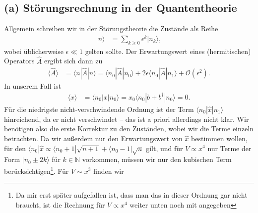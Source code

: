 \documentclass[english, parskip=full]{scrartcl}
\renewcommand{\bra}{}
\renewcommand{\braket}{}
\newcommand{\Bra}{}
\newcommand{\Ket}{}
\begin{document}
\subsection*{(a) Störungsrechnung in der Quantentheorie}
Allgemein schreiben wir in der Störungstheorie die Zustände als Reihe
\begin{align}
\Ket | n \rangle &= \sum_{k\ge 0} \epsilon^k \Ket | n_k \rangle,
\end{align}
wobei üblicherweise $\epsilon\ll 1$ gelten sollte.
Der Erwartungswert eines (hermitischen) Operators $\hat{A}$ ergibt sich dann zu
\begin{align}
\bra\langle \hat{A} \rangle &= \braket\langle n | \hat{A} | n \rangle = \braket\langle n_0 | \hat{A} | n_0 \rangle + 2\epsilon \braket\langle n_0 | \hat{A} | n_1 \rangle + \mathcal{O}(\epsilon^2).
\end{align}
In unserem Fall ist
\begin{align}
\bra\langle x \rangle &= \braket\langle n_0 | x | n_0 \rangle = x_0 \braket\langle n_0 | b + b^\dagger | n_0 \rangle = 0.
\end{align}
Für die niedrigste nicht-verschwindende Ordnung ist der Term $\braket\langle n_0 | \hat{x} | n_1 \rangle$ hinreichend, da er nicht verschwindet -- das ist a priori allerdings nicht klar.
Wir benötigen also die erste Korrektur zu den Zuständen, wobei wir die Terme einzeln betrachten.
Da wir außerdem nur den Erwartungswert von $\hat{x}$ bestimmen wollen, für den $\Bra\langle n_0 |\hat{x} \propto \Bra\langle n_0+1 |\sqrt{n+1} + \Bra\langle n_0-1 |\sqrt{n}$ gilt, und für $V\propto x^4$ nur Terme der Form $\Ket | n_0\pm 2k \rangle$ für $k\in\mathbb{N}$ vorkommen, müssen wir nur den kubischen Term berücksichtigen\footnote{Da mir erst später aufgefallen ist, dass man das in dieser Ordnung gar nicht braucht, ist die Rechnung für $V\propto x^4$ weiter unten noch mit angegeben}.
Für $V\sim x^3$ finden wir 
\end{document}
